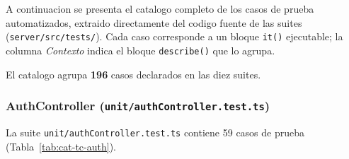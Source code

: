 
A continuacion se presenta el catalogo completo de los casos de prueba automatizados, extraido directamente del codigo fuente de las suites (\texttt{server/src/tests/}). Cada caso corresponde a un bloque \texttt{it()} ejecutable; la columna \emph{Contexto} indica el bloque \texttt{describe()} que lo agrupa.


El catalogo agrupa \textbf{196} casos declarados en las diez suites.


\subsubsection{AuthController (\texttt{unit/authController.test.ts})}
La suite \texttt{unit/authController.test.ts} contiene 59 casos de prueba (Tabla~\ref{tab:cat-tc-auth}).
